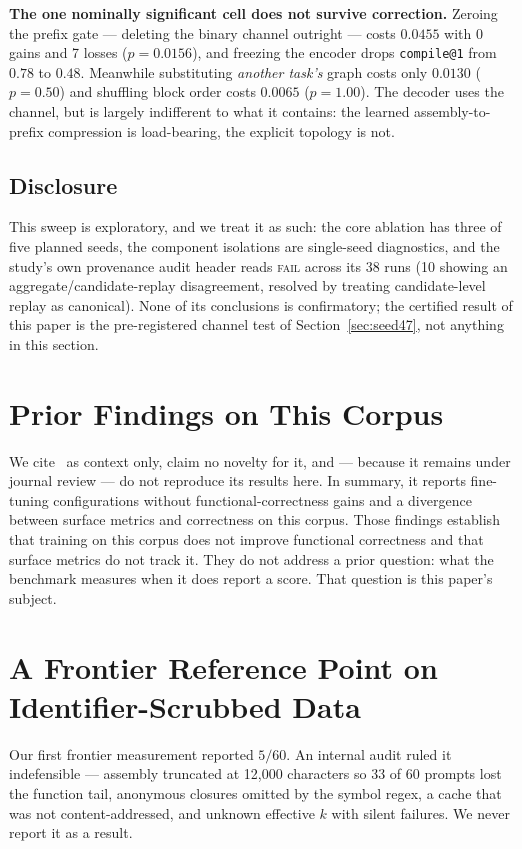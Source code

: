 \documentclass[conference]{IEEEtran}
\makeatletter
\newcommand{\compileat}[1]{\texttt{compile@#1}\xspace}
\makeatother
\begin{document}
\textbf{The one nominally significant cell does not survive correction.} Zeroing the prefix
gate --- deleting the binary channel outright --- costs $0.0455$ with 0 gains and
7 losses ($p{=}0.0156$), and freezing the encoder drops \compileat{1} from
$0.78$ to $0.48$. Meanwhile substituting \emph{another task's} graph costs only
$0.0130$ ($p{=}0.50$) and shuffling block order costs $0.0065$ ($p{=}1.00$). The
decoder uses the channel, but is largely indifferent to what it contains: the
learned assembly-to-prefix compression is load-bearing, the explicit topology is
not.

\subsection{Disclosure}
This sweep is exploratory, and we treat it as such: the core ablation has three
of five planned seeds, the component isolations are single-seed diagnostics, and
the study's own provenance audit header reads \textsc{fail} across its 38 runs
(10 showing an aggregate/candidate-replay disagreement, resolved by treating
candidate-level replay as canonical). None of its conclusions is confirmatory;
the certified result of this paper is the pre-registered channel test of
Section~\ref{sec:seed47}, not anything in this section.

\section{Prior Findings on This Corpus}
\label{sec:prior}
We cite~\cite{abualazm2026tosem} as context only, claim no novelty for it, and
--- because it remains under journal review --- do not reproduce its results
here. In summary, it reports fine-tuning configurations without
functional-correctness gains and a divergence between surface metrics and
correctness on this corpus. Those findings establish that training on this
corpus does not improve functional correctness and that surface metrics do not
track it. They do not address a prior question: what the benchmark measures when
it does report a score. That question is this paper's subject.

\section{A Frontier Reference Point on Identifier-Scrubbed Data}
\label{sec:frontier}
Our first frontier measurement reported $5/60$. An internal audit ruled it
indefensible --- assembly truncated at 12{,}000 characters so 33 of 60 prompts
lost the function tail, anonymous closures omitted by the symbol regex, a cache
that was not content-addressed, and unknown effective $k$ with silent failures.
We never report it as a result.
\end{document}
